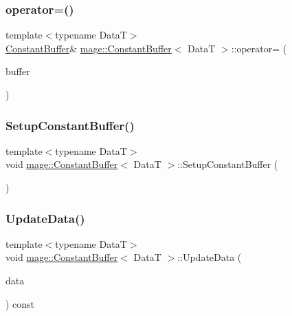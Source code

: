 \subsubsection{\texorpdfstring{operator=()}{operator=()}\hspace{0.1cm}{\footnotesize\ttfamily [2/2]}}
{\footnotesize\ttfamily template$<$typename DataT$>$ \\
\hyperlink{structmage_1_1_constant_buffer}{Constant\+Buffer}\& \hyperlink{structmage_1_1_constant_buffer}{mage\+::\+Constant\+Buffer}$<$ DataT $>$\+::operator= (\begin{DoxyParamCaption}\item[{\hyperlink{structmage_1_1_constant_buffer}{Constant\+Buffer}$<$ DataT $>$ \&\&}]{buffer }\end{DoxyParamCaption})\hspace{0.3cm}{\ttfamily [delete]}}

\hypertarget{structmage_1_1_constant_buffer_ab44b95795f110d3097a24edd71aa790e}{}\label{structmage_1_1_constant_buffer_ab44b95795f110d3097a24edd71aa790e} 
\subsubsection{\texorpdfstring{Setup\+Constant\+Buffer()}{SetupConstantBuffer()}}
{\footnotesize\ttfamily template$<$typename DataT$>$ \\
void \hyperlink{structmage_1_1_constant_buffer}{mage\+::\+Constant\+Buffer}$<$ DataT $>$\+::Setup\+Constant\+Buffer (\begin{DoxyParamCaption}{ }\end{DoxyParamCaption})\hspace{0.3cm}{\ttfamily [private]}}

\hypertarget{structmage_1_1_constant_buffer_a535429ca9cf81b44907b581324854392}{}\label{structmage_1_1_constant_buffer_a535429ca9cf81b44907b581324854392} 
\subsubsection{\texorpdfstring{Update\+Data()}{UpdateData()}}
{\footnotesize\ttfamily template$<$typename DataT$>$ \\
void \hyperlink{structmage_1_1_constant_buffer}{mage\+::\+Constant\+Buffer}$<$ DataT $>$\+::Update\+Data (\begin{DoxyParamCaption}\item[{const DataT \&}]{data }\end{DoxyParamCaption}) const}




